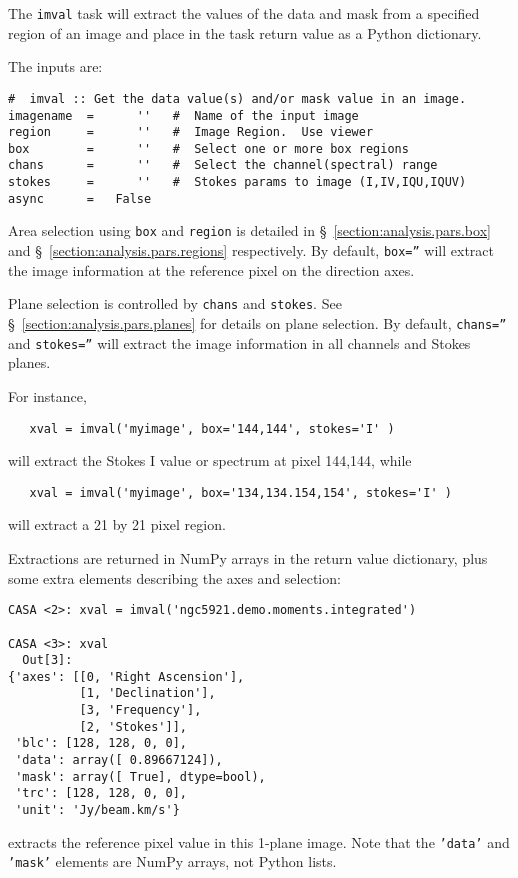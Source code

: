 The {\tt imval} task will extract the values of the data and mask
from a specified region of an image and place in the task return
value as a Python dictionary.

The inputs are:
\small
\begin{verbatim}
#  imval :: Get the data value(s) and/or mask value in an image.
imagename  =      ''   #  Name of the input image
region     =      ''   #  Image Region.  Use viewer
box        =      ''   #  Select one or more box regions
chans      =      ''   #  Select the channel(spectral) range
stokes     =      ''   #  Stokes params to image (I,IV,IQU,IQUV)
async      =   False       
\end{verbatim}
\normalsize

Area selection using {\tt box} and {\tt region} is detailed in 
\S~\ref{section:analysis.pars.box} and
\S~\ref{section:analysis.pars.regions} respectively.
By default, {\tt box=''} will
extract the image information at the reference pixel on the
direction axes.

Plane selection is controlled by {\tt chans} and {\tt stokes}.
See \S~\ref{section:analysis.pars.planes} for details on plane
selection.  By default, {\tt chans=''} and {\tt stokes=''} will
extract the image information in all channels and Stokes planes.

For instance,
\small
\begin{verbatim}
   xval = imval('myimage', box='144,144', stokes='I' )
\end{verbatim}
\normalsize
will extract the Stokes I value or spectrum at pixel 144,144, while
\small
\begin{verbatim}
   xval = imval('myimage', box='134,134.154,154', stokes='I' )
\end{verbatim}
\normalsize
will extract a 21 by 21 pixel region.

Extractions are returned in NumPy arrays in the return value
dictionary, plus some extra elements describing the axes and selection:
\small
\begin{verbatim}
CASA <2>: xval = imval('ngc5921.demo.moments.integrated')

CASA <3>: xval
  Out[3]: 
{'axes': [[0, 'Right Ascension'],
          [1, 'Declination'],
          [3, 'Frequency'],
          [2, 'Stokes']],
 'blc': [128, 128, 0, 0],
 'data': array([ 0.89667124]),
 'mask': array([ True], dtype=bool),
 'trc': [128, 128, 0, 0],
 'unit': 'Jy/beam.km/s'}
\end{verbatim}
\normalsize
extracts the reference pixel value in this 1-plane image.  Note that
the {\tt 'data'} and {\tt 'mask'} elements are NumPy arrays, not 
Python lists.

